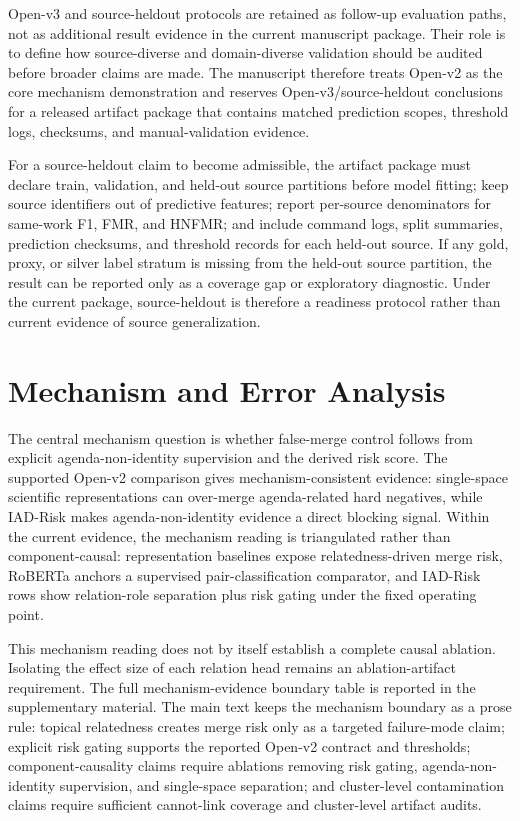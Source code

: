 \documentclass[11pt]{article}
\begin{document}
Open-v3 and source-heldout protocols are retained as follow-up evaluation paths, not as additional result evidence in the current manuscript package. Their role is to define how source-diverse and domain-diverse validation should be audited before broader claims are made. The manuscript therefore treats Open-v2 as the core mechanism demonstration and reserves Open-v3/source-heldout conclusions for a released artifact package that contains matched prediction scopes, threshold logs, checksums, and manual-validation evidence.

For a source-heldout claim to become admissible, the artifact package must declare train, validation, and held-out source partitions before model fitting; keep source identifiers out of predictive features; report per-source denominators for same-work F1, FMR, and HNFMR; and include command logs, split summaries, prediction checksums, and threshold records for each held-out source. If any gold, proxy, or silver label stratum is missing from the held-out source partition, the result can be reported only as a coverage gap or exploratory diagnostic. Under the current package, source-heldout is therefore a readiness protocol rather than current evidence of source generalization.

\section{Mechanism and Error Analysis}

The central mechanism question is whether false-merge control follows from explicit agenda-non-identity supervision and the derived risk score. The supported Open-v2 comparison gives mechanism-consistent evidence: single-space scientific representations can over-merge agenda-related hard negatives, while IAD-Risk makes agenda-non-identity evidence a direct blocking signal. Within the current evidence, the mechanism reading is triangulated rather than component-causal: representation baselines expose relatedness-driven merge risk, RoBERTa anchors a supervised pair-classification comparator, and IAD-Risk rows show relation-role separation plus risk gating under the fixed operating point.

This mechanism reading does not by itself establish a complete causal ablation. Isolating the effect size of each relation head remains an ablation-artifact requirement. The full mechanism-evidence boundary table is reported in the supplementary material. The main text keeps the mechanism boundary as a prose rule: topical relatedness creates merge risk only as a targeted failure-mode claim; explicit risk gating supports the reported Open-v2 contract and thresholds; component-causality claims require ablations removing risk gating, agenda-non-identity supervision, and single-space separation; and cluster-level contamination claims require sufficient cannot-link coverage and cluster-level artifact audits.
\end{document}
